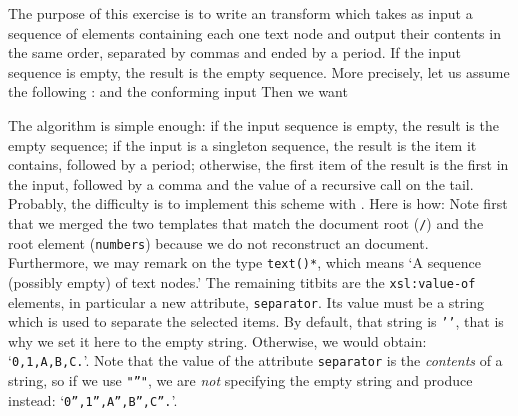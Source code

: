 \label{par:CSV}

The purpose of this exercise is to write an \XSLT transform which
takes as input a sequence of elements containing each one text node
and output their contents in the same order, separated by commas and
ended by a period. If the input sequence is empty, the result is the
empty sequence. More precisely, let us assume the following \DTD:
\noindent and the conforming input
\noindent Then we want

The algorithm is simple enough: if the input sequence is empty, the
result is the empty sequence; if the input is a singleton sequence,
the result is the item it contains, followed by a period; otherwise,
the first item of the result is the first in the input, followed by a
comma and the value of a recursive call on the tail. Probably, the
difficulty is to implement this scheme with \XSLT. Here is how:
\noindent Note first that we merged the two templates that match the
document root (\texttt{/}) and the root element (\texttt{numbers})
because we do not reconstruct an \XML document. Furthermore, we may
remark on the type \texttt{text()*}, which means `A sequence (possibly
empty) of text nodes.' The remaining titbits are the
\texttt{xsl:value-of} elements, in particular a new attribute,
\texttt{separator}. Its value must be a string which is used to
separate the selected items. By default, that string is
\texttt{'\textvisiblespace'}, that is why we set it here to the empty
string. Otherwise, we would obtain:
`\texttt{0\textvisiblespace,1\textvisiblespace,A\textvisiblespace,B\textvisiblespace,C\textvisiblespace.}'. Note
that the value of the attribute \texttt{separator} is the
\emph{contents} of a string, so if we use \texttt{"''"}, we are
\emph{not} specifying the empty string and produce instead:
`\texttt{0'',1'',A'',B'',C''.}'.

